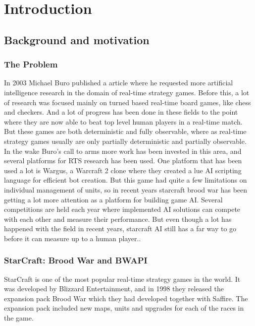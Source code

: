
\chapter{Introduction}

\section{Background and motivation}

\subsection{The Problem}
In 2003 Michael Buro published a article where he requested more artificial intelligence research in the domain of real-time strategy games.\cite{buro2003real} Before this, a lot of research was focused mainly on turned based real-time board games, like chess and checkers. And a lot of progress has been done in these fields to the point where they are now able to beat top level human players in a real-time match. \cite{campbell2002deep} But these games are both deterministic and fully observable, where as real-time strategy games usually are only partially deterministic and partially observable. 
In the wake Buro's call to arms more work has been invested in this area, and several platforms for RTS research has been used. One platform that has been used a lot is Wargus\cite{wargus}, a Warcraft 2 clone where they created a lue AI scripting language for efficient bot creation. But this game had quite a few limitations on individual management of units, so in recent years starcraft brood war has been getting a lot more attention as a platform for building game AI. Several competitions are held each year where implemented AI solutions can compete with each other and measure their performance. But even though a lot has happened with the field in recent years, starcraft AI still has a far way to go before it can measure up to a human player.\cite{eisbotvsfong}.

\subsection{StarCraft: Brood War and BWAPI}
StarCraft is one of the most popular real-time strategy games in the world. It
was developed by Blizzard Entertainment, and in 1998 they released the expansion
pack Brood War which they had developed together with Saffire. The expansion pack included new maps, units and upgrades for each of the races in the game. 

